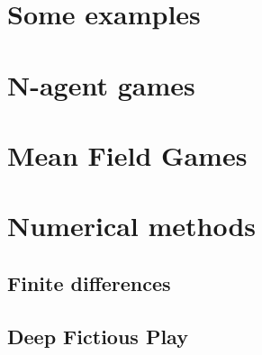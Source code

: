 \section{Some examples}
\section{N-agent games}
\section{Mean Field Games}
\section{Numerical methods}
\subsection{Finite differences}
\subsection{Deep Fictious Play}